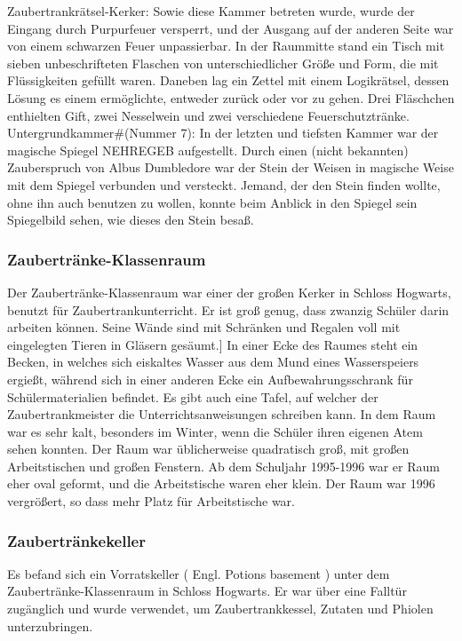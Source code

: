 \documentclass[a4paper, 10pt]{article}
\begin{document}
Zaubertrankrätsel-Kerker: Sowie diese Kammer betreten wurde, wurde der Eingang durch Purpurfeuer versperrt, und der Ausgang auf der anderen Seite war von einem schwarzen Feuer unpassierbar. In der Raummitte stand ein Tisch mit sieben unbeschrifteten Flaschen von unterschiedlicher Größe und Form, die mit Flüssigkeiten gefüllt waren. Daneben lag ein Zettel mit einem Logikrätsel, dessen Lösung es einem ermöglichte, entweder zurück oder vor zu gehen. Drei Fläschchen enthielten Gift, zwei Nesselwein und zwei verschiedene Feuerschutztränke.
\vspace{10pt}
\newline
{}  
Untergrundkammer#(Nummer 7): In der letzten und tiefsten Kammer war der magische Spiegel NEHREGEB aufgestellt. Durch einen (nicht bekannten) Zauberspruch von Albus Dumbledore war der Stein der Weisen in magische Weise mit dem Spiegel verbunden und versteckt. Jemand, der den Stein finden wollte, ohne ihn auch benutzen zu wollen, konnte beim Anblick in den Spiegel sein Spiegelbild sehen, wie dieses den Stein besaß.
\subsubsection*{\large Zaubertränke-Klassenraum}
Der Zaubertränke-Klassenraum war einer der großen Kerker in Schloss Hogwarts, benutzt für Zaubertrankunterricht. Er ist groß genug, dass zwanzig Schüler darin arbeiten können. Seine Wände sind mit Schränken und Regalen voll mit eingelegten Tieren in Gläsern gesäumt.] In einer Ecke des Raumes steht ein Becken, in welches sich eiskaltes Wasser aus dem Mund eines Wasserspeiers ergießt, während sich in einer anderen Ecke ein Aufbewahrungsschrank für Schülermaterialien befindet. Es gibt auch eine Tafel, auf welcher der Zaubertrankmeister die Unterrichtsanweisungen schreiben kann. In dem Raum war es sehr kalt, besonders im Winter, wenn die Schüler ihren eigenen Atem sehen konnten. Der Raum war üblicherweise quadratisch groß, mit großen Arbeitstischen und großen Fenstern. Ab dem Schuljahr 1995-1996 war er Raum eher oval geformt, und die Arbeitstische waren eher klein. Der Raum war 1996 vergrößert, so dass mehr Platz für Arbeitstische war.
\subsubsection*{\large Zaubertränkekeller}
Es befand sich ein Vorratskeller (  Engl.  Potions basement ) unter dem Zaubertränke-Klassenraum in Schloss Hogwarts. Er war über eine Falltür zugänglich und wurde verwendet, um Zaubertrankkessel, Zutaten und Phiolen unterzubringen.
\end{document}
